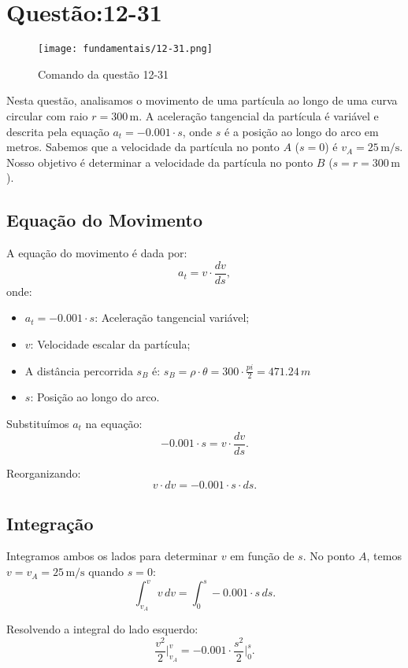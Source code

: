 \newpage
\section{Questão:12-31}

\begin{figure}[H]
	\centering
	\texttt{[image: fundamentais/12-31.png]}
	\caption{Comando da questão 12-31}\label{fig:12-31}
\end{figure}


Nesta questão, analisamos o movimento de uma partícula ao longo de uma curva circular com raio \(r = 300 \, \text{m}\). A aceleração tangencial da partícula é variável e descrita pela equação \(a_t = -0.001 \cdot s\), onde \(s\) é a posição ao longo do arco em metros. Sabemos que a velocidade da partícula no ponto \(A\) (\(s = 0\)) é \(v_A = 25 \, \text{m/s}\). Nosso objetivo é determinar a velocidade da partícula no ponto \(B\) (\(s = r = 300 \, \text{m}\)).

\subsection*{Equação do Movimento}
A equação do movimento é dada por:
\[
a_t = v \cdot \frac{dv}{ds},
\]
onde:
\begin{itemize}
    \item \(a_t = -0.001 \cdot s\): Aceleração tangencial variável;
    \item \(v\): Velocidade escalar da partícula;
    \item A distância percorrida \(s_B\) é: \( s_B = \rho \cdot \theta = 300\cdot \frac{pi}{2} = 471.24\, m\)
    
    \item \(s\): Posição ao longo do arco.
\end{itemize}

Substituímos \(a_t\) na equação:
\[
-0.001 \cdot s = v \cdot \frac{dv}{ds}.
\]

Reorganizando:
\[
v \cdot dv = -0.001 \cdot s \cdot ds.
\]

\subsection*{Integração}
Integramos ambos os lados para determinar \(v\) em função de \(s\). No ponto \(A\), temos \(v = v_A = 25 \, \text{m/s}\) quando \(s = 0\):
\[
\int_{v_A}^{v} v \, dv = \int_{0}^{s} -0.001 \cdot s \, ds.
\]

Resolvendo a integral do lado esquerdo:
\[
\frac{v^2}{2} \bigg|_{v_A}^{v} = -0.001 \cdot \frac{s^2}{2} \bigg|_{0}^{s}.
\]

